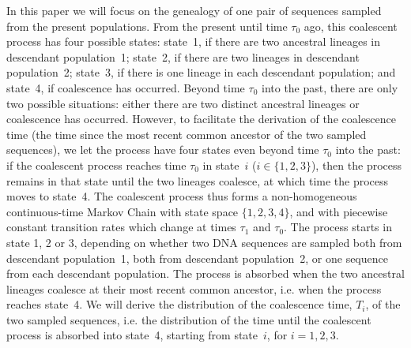 \documentclass[11pt]{article}
\begin{document}
In this paper we will focus on the genealogy of one pair of sequences sampled from the present populations. From the present until time $\tau_0$ ago, this coalescent process has four possible states: state~1, if there are two ancestral lineages in descendant population~1;
state~2, if there are two lineages in descendant population~2; state~3, if there is one lineage in each descendant population; 
and state~4, if coalescence has occurred. Beyond time $\tau_0$ into the past, there are only two possible situations: either there are two distinct ancestral lineages or coalescence has occurred. However, to facilitate the derivation of the coalescence time (the time since the most recent common ancestor of the two sampled sequences), we let the process have four states even beyond time $\tau_0$ into the past: if the coalescent process reaches time $\tau_0$ in state~$i$ ($i \in \{1,2,3 \}$), then the process remains in that state until the two lineages coalesce, at which time the process moves to state~4. The coalescent process thus forms a non-homogeneous continuous-time Markov Chain with state space 
$\{1,2,3,4\}$, and with piecewise constant transition rates which change at times $\tau_1$ and $\tau_0$.
The process starts in state 1, 2 or 3, depending on whether two DNA sequences are sampled both from descendant population~1,
both from descendant population~2, or one sequence from each descendant population. 
The process is absorbed when the two ancestral lineages coalesce at their most recent common ancestor, i.e. when the process reaches state~4. We will derive the distribution of the coalescence time, $T_i$, of the two sampled sequences, i.e. the distribution of 
the time until the coalescent process is absorbed into state~4, starting from state~$i$, for $i=1,2,3$.


\end{document}

